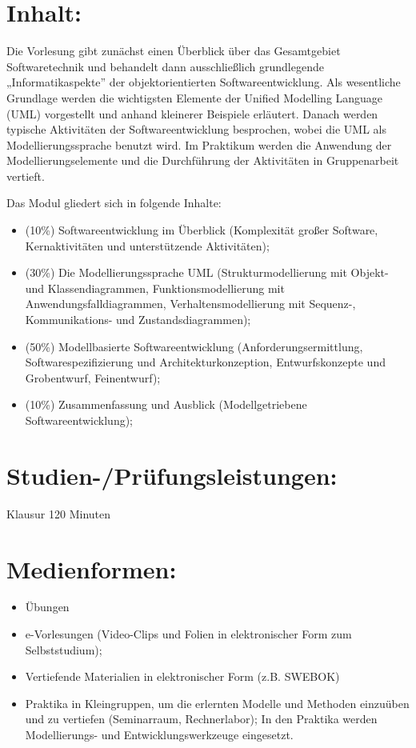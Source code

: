\section*{Inhalt:}\label{inhalt-26}

Die Vorlesung gibt zunächst einen Überblick über das Gesamtgebiet
Softwaretechnik und behandelt dann ausschließlich grundlegende
„Informatikaspekte'' der objektorientierten Softwareentwicklung. Als
wesentliche Grundlage werden die wichtigsten Elemente der Unified
Modelling Language (UML) vorgestellt und anhand kleinerer Beispiele
erläutert. Danach werden typische Aktivitäten der Softwareentwicklung
besprochen, wobei die UML als Modellierungssprache benutzt wird. Im
Praktikum werden die Anwendung der Modellierungselemente und die
Durchführung der Aktivitäten in Gruppenarbeit vertieft.

Das Modul gliedert sich in folgende Inhalte:

\begin{itemize}
\item
  (10\%) Softwareentwicklung im Überblick (Komplexität großer Software,
  Kernaktivitäten und unterstützende Aktivitäten);
\item
  (30\%) Die Modellierungssprache UML (Strukturmodellierung mit Objekt-
  und Klassendiagrammen, Funktionsmodellierung mit
  Anwendungsfalldiagrammen, Verhaltensmodellierung mit Sequenz-,
  Kommunikations- und Zustandsdiagrammen);
\item
  (50\%) Modellbasierte Softwareentwicklung (Anforderungsermittlung,
  Softwarespezifizierung und Architekturkonzeption, Entwurfskonzepte und
  Grobentwurf, Feinentwurf);
\item
  (10\%) Zusammenfassung und Ausblick (Modellgetriebene
  Softwareentwicklung);
\end{itemize}

\section*{Studien-/Prüfungsleistungen:}\label{studien-pruxfcfungsleistungen-21}

Klausur 120 Minuten

\section*{Medienformen:}\label{medienformen-15}

\begin{itemize}
\item
  Übungen
\item
  e-Vorlesungen (Video-Clips und Folien in elektronischer Form zum
  Selbststudium);
\item
  Vertiefende Materialien in elektronischer Form (z.B. SWEBOK)
\item
  Praktika in Kleingruppen, um die erlernten Modelle und Methoden
  einzuüben und zu vertiefen (Seminarraum, Rechnerlabor); In den
  Praktika werden Modellierungs- und Entwicklungswerkzeuge eingesetzt.
\end{itemize}

